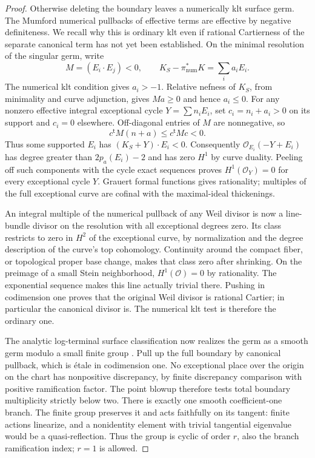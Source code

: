\documentclass[11pt,letterpaper]{article}
\theoremstyle{definition}
\theoremstyle{remark}
\begin{document}
\begin{proof}
Otherwise deleting the boundary leaves a numerically klt surface
germ.  The Mumford numerical pullbacks of effective terms are
effective by negative definiteness.  We recall why this is ordinary
klt even if rational Cartierness of the separate canonical term has
not yet been established.  On the minimal resolution of the
singular germ, write
\[
 M=(E_i\cdot E_j)<0,\qquad
 K_S-\pi^*_{\mathrm{num}}K=\sum_i a_iE_i.
\]
The numerical klt condition gives $a_i>-1$.  Relative nefness of
$K_S$, from minimality and curve adjunction, gives $Ma\geq0$ and
hence $a_i\leq0$.  For any nonzero effective integral exceptional
cycle $Y=\sum n_iE_i$, set $c_i=n_i+a_i>0$ on its support and
$c_i=0$ elsewhere.  Off-diagonal entries of $M$ are nonnegative, so
\begin{equation}
 c^{\mathsf t}M(n+a)\leq c^{\mathsf t}Mc<0.
 \label{bir:numerical-surface}
\end{equation}
Thus some supported $E_i$ has $(K_S+Y)\cdot E_i<0$.
Consequently $\mathcal{O}_{E_i}(-Y+E_i)$ has degree greater than
$2p_a(E_i)-2$ and has zero $H^1$ by curve duality.  Peeling off such
components with the cycle exact sequences proves
$H^1(\mathcal{O}_Y)=0$ for every exceptional cycle $Y$.  Grauert formal
functions gives rationality; multiples of the full exceptional
curve are cofinal with the maximal-ideal thickenings.

An integral multiple of the numerical pullback of any Weil divisor
is now a line-bundle divisor on the resolution with all exceptional
degrees zero.  Its class restricts to zero in $H^2$ of the
exceptional curve, by normalization and the degree description of
the curve's top cohomology.  Continuity around the compact fiber,
or topological proper base change, makes that class zero after
shrinking.  On the preimage of a small Stein neighborhood,
$H^1(\mathcal{O})=0$ by rationality.  The exponential sequence makes this
line actually trivial there.  Pushing in codimension one proves
that the original Weil divisor is rational Cartier; in particular
the canonical divisor is.  The numerical klt test is therefore the
ordinary one.

The analytic log-terminal surface classification now realizes the
germ as a smooth germ modulo a small finite group
\cite[Chapter~4]{BirationalGeometry}.  Pull up the full boundary by
canonical pullback, which is \mbox{\'etale} in codimension one.  No
exceptional place over the origin on the chart has nonpositive
discrepancy, by finite discrepancy comparison with positive
ramification factor.  The point blowup therefore tests total
boundary multiplicity strictly below two.  There is exactly one
smooth coefficient-one branch.  The finite group preserves it and
acts faithfully on its tangent: finite actions linearize, and a
nonidentity element with trivial tangential eigenvalue would be a
quasi-reflection.  Thus the group is cyclic of order $r$, also the
branch ramification index; $r=1$ is allowed.


\end{proof}
\end{document}
